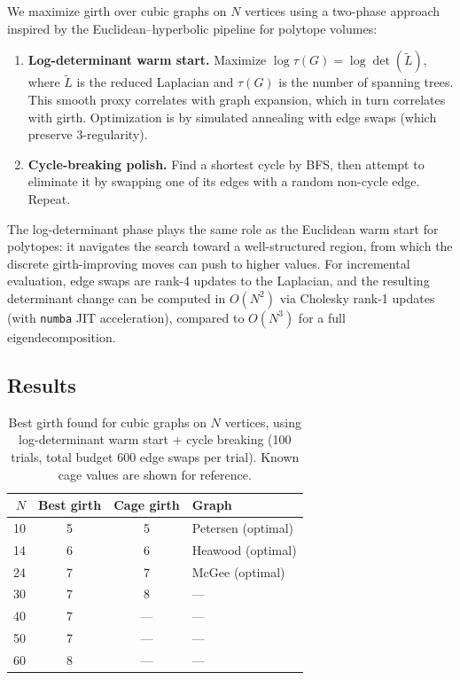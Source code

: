 \documentclass[11pt]{article}
\begin{document}
We maximize girth over cubic graphs on $N$ vertices using a two-phase
approach inspired by the Euclidean--hyperbolic pipeline for polytope
volumes:
\begin{enumerate}[label=(\roman*)]
\item \textbf{Log-determinant warm start.}  Maximize
      $\log \tau(G) = \log \det(\tilde L)$, where $\tilde L$ is the
      reduced Laplacian and $\tau(G)$ is the number of spanning trees.
      This smooth proxy correlates with graph expansion, which in turn
      correlates with girth.  Optimization is by simulated annealing
      with edge swaps (which preserve $3$-regularity).
\item \textbf{Cycle-breaking polish.}  Find a shortest cycle by BFS,
      then attempt to eliminate it by swapping one of its edges with
      a random non-cycle edge.  Repeat.
\end{enumerate}

The log-determinant phase plays the same role as the Euclidean
warm start for polytopes: it navigates the search toward a
well-structured region, from which the discrete girth-improving
moves can push to higher values.  For incremental evaluation,
edge swaps are rank-4 updates to the Laplacian, and the resulting
determinant change can be computed in $O(N^2)$ via Cholesky
rank-1 updates (with \texttt{numba} JIT acceleration), compared
to $O(N^3)$ for a full eigendecomposition.

\subsection{Results}

\begin{table}[ht]
\centering
\caption{Best girth found for cubic graphs on $N$ vertices,
using log-determinant warm start + cycle breaking
(100 trials, total budget 600 edge swaps per trial).
Known cage values are shown for reference.}
\label{tab:cages}
\smallskip
\begin{tabular}{r c c l}
\toprule
$N$ & Best girth & Cage girth & Graph \\
\midrule
10 & 5 & 5 & Petersen (optimal) \\
14 & 6 & 6 & Heawood (optimal) \\
24 & 7 & 7 & McGee (optimal) \\
30 & 7 & 8 & --- \\
40 & 7 & --- & --- \\
50 & 7 & --- & --- \\
60 & 8 & --- & --- \\
\bottomrule
\end{tabular}
\end{table}
\end{document}
